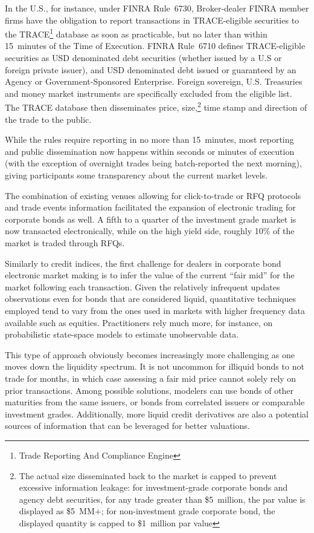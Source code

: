 \begin{enumerate}
In the U.S., for instance, under FINRA Rule~6730, Broker-dealer FINRA member firms have the obligation to report transactions in TRACE-eligible securities to the TRACE\footnote{Trade Reporting And Compliance Engine} database as soon as practicable, but no later than within 15~minutes of the Time of Execution. FINRA Rule~6710 defines TRACE-eligible securities as USD denominated debt securities (whether issued by a U.S or foreign private issuer), and USD denominated debt issued or guaranteed by an Agency or Government-Sponsored Enterprise. Foreign sovereign, U.S. Treasuries and money market instruments are specifically excluded from the eligible list. The TRACE database then disseminates price, size,\footnote{The actual size disseminated back to the market is capped to prevent excessive information leakage: for investment-grade corporate bonds and agency debt securities, for any trade greater than \$5~million, the par value is displayed as \$5~MM$+$; for non-investment grade corporate bond, the displayed quantity is capped to \$1~million par value} time stamp and direction of the trade to the public.


While the rules require reporting in no more than 15~minutes, most reporting and public dissemination now happens within seconds or minutes of execution (with the exception of overnight trades being batch-reported the next morning), giving participants some transparency about the current market levels.


The combination of existing venues allowing for click-to-trade or RFQ protocols and trade events information facilitated the expansion of electronic trading for corporate bonds as well. A fifth to a quarter of the investment grade market is now transacted electronically, while on the high yield side, roughly 10\% of the market is traded through RFQs.


Similarly to credit indices, the first challenge for dealers in corporate bond electronic market making is to infer the value of the current ``fair mid'' for the market following each transaction. Given the relatively infrequent updates observations even for bonds that are considered liquid, quantitative techniques employed tend to vary from the ones used in markets with higher frequency data available such as equities. Practitioners rely much more, for instance, on probabilistic state-space models to estimate unobservable data.


This type of approach obviously becomes increasingly more challenging as one moves down the liquidity spectrum. It is not uncommon for illiquid bonds to not trade for months, in which case assessing a fair mid price cannot solely rely on prior transactions. Among possible solutions, modelers can use bonds of other maturities from the same issuers, or bonds from correlated issuers or comparable investment grades. Additionally, more liquid credit derivatives are also a potential sources of information that can be leveraged for better valuations.
\end{enumerate}



